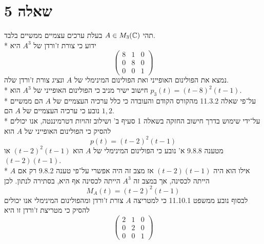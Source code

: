 \section{שאלה 5}
תהי $A \in M_3(\mathbb{C})$ בעלת ערכים עצמיים ממשיים בלבד. \\*
ידוע כי צורת ז'ורדן של $A^3$ היא
\[
	\begin{pmatrix}
		8 & 1 & 0 \\
		0 & 8 & 0 \\
		0 & 0 & 1
	\end{pmatrix}
\]
נמצא את הפולינום האופייני ואת הפולינום המינימלי של $A$ ונציג צורת ז'ורדן שלה. \\*
חישוב ישיר מניב כי הפולינום האופייני של $A^3$ הוא $p_3(t) = {(t - 8)}^2 (t - 1)$. \\*
על־פי שאלה 11.3.2 מהקורס הקודם והעובדה כי כלל ערכיה העצמיים של $A$ הם ממשיים נובע כי ערכיה העצמיים של $A$ הם $1, 2$. \\*
על־ידי שימוש בדרך חישוב החזקה בשאלה 1 סעיף ב' ושילוב זהויות דטרמיננטה, אנו יכולים להסיק כי הפולינום האופייני של $A$ הוא
\[
	p(t) = {(t - 2)}^2 (t - 1)
\]
מטענה 9.8.8 א' נובע כי הפולינום המינימלי של $A$ הוא ${(t - 2)}^2(t-1)$ או $(t - 2)(t - 1)$. \\*
אילו הוא היה $(t - 2)(t - 1)$ אז מצב זה היה אפשרי על־פי טענה 9.8.2 רק אם $A$ הייתה לכסינה, אך במצב זה $A^3$ הייתה לכסינה אף היא, בסתירה לנתון. לכן
\[
	M_A(t) = {(t - 2)}^2 (t - 1) 
\]
לבסוף נובע ממשפט 11.10.1 כי למטריצה $A$ צורת ז'ורדן ומהפולינום המינימלי אנו יכולים להסיק כי מטריצת ז'ורדן זו היא
\[
	\begin{pmatrix}
		2 & 1 & 0 \\
		0 & 2 & 0 \\
		0 & 0 & 1
	\end{pmatrix}
\]


